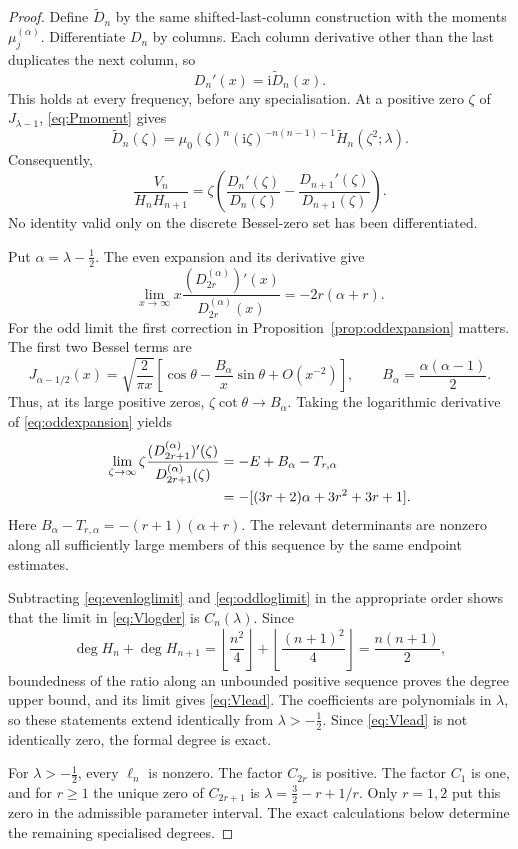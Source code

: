 \documentclass[11pt]{article}
\numberwithin{equation}{section}
\theoremstyle{remark}
\newcommand{\ii}{\mathrm{i}}
\newcommand{\wt}{\widetilde}
\begin{document}
\begin{proof}
Define $\wt D_n$ by the same shifted-last-column construction with the
moments $\mu_j^{(\alpha)}$. Differentiate $D_n$ by columns. Each
column derivative other than the last duplicates the next column, so
\begin{equation}\label{eq:shiftderivative}
                              D_n'(x)=\ii\wt D_n(x).
\end{equation}
This holds at every frequency, before any specialisation. At a positive
zero $\zeta$ of $J_{\lambda-1}$, \eqref{eq:Pmoment} gives
\[
 \wt D_n(\zeta)=\mu_0(\zeta)^n
          (\ii\zeta)^{-n(n-1)-1}\wt H_n(\zeta^2;\lambda).
\]
Consequently,
\begin{equation}\label{eq:Vlogder}
 \frac{V_n}{H_nH_{n+1}}
 =\zeta\left(\frac{D_n'(\zeta)}{D_n(\zeta)}
             -\frac{D_{n+1}'(\zeta)}{D_{n+1}(\zeta)}\right).
\end{equation}
No identity valid only on the discrete Bessel-zero set has been
differentiated.

Put $\alpha=\lambda-\tfrac12$. The even expansion and its derivative
give
\begin{equation}\label{eq:evenloglimit}
 \lim_{x\to\infty}x\frac{(D_{2r}^{(\alpha)})'(x)}{D_{2r}^{(\alpha)}(x)}
                        =-2r(\alpha+r).
\end{equation}
For the odd limit the first correction in
Proposition~\ref{prop:oddexpansion} matters. The first two Bessel terms
are
\[
 J_{\alpha-1/2}(x)=\sqrt{\frac2{\pi x}}
 \left[\cos\theta-\frac{B_\alpha}{x}\sin\theta+O(x^{-2})\right],
 \qquad B_\alpha=\frac{\alpha(\alpha-1)}2.
\]
Thus, at its large positive zeros, $\zeta\cot\theta\to B_\alpha$.
Taking the logarithmic derivative of \eqref{eq:oddexpansion} yields
\begin{align}
 \lim_{\zeta\to\infty}\zeta
 \frac{(D_{2r+1}^{(\alpha)})'(\zeta)}{D_{2r+1}^{(\alpha)}(\zeta)}
 &=-E+B_\alpha-T_{r,\alpha}\notag\\
 &=-[(3r+2)\alpha+3r^2+3r+1].\label{eq:oddloglimit}
\end{align}
Here $B_\alpha-T_{r,\alpha}=-(r+1)(\alpha+r)$. The relevant
determinants are nonzero along all sufficiently large members of this
sequence by the same endpoint estimates.

Subtracting \eqref{eq:evenloglimit} and \eqref{eq:oddloglimit} in
the appropriate order shows that the limit in \eqref{eq:Vlogder} is
$C_n(\lambda)$. Since
\[
 \deg H_n+\deg H_{n+1}
 =\left\lfloor\frac{n^2}4\right\rfloor
  +\left\lfloor\frac{(n+1)^2}4\right\rfloor=\frac{n(n+1)}2,
\]
boundedness of the ratio along an unbounded positive sequence proves
the degree upper bound, and its limit gives \eqref{eq:Vlead}.
The coefficients are polynomials in $\lambda$, so these statements
extend identically from $\lambda>-\tfrac12$. Since \eqref{eq:Vlead}
is not identically zero, the formal degree is exact.

For $\lambda>-\tfrac12$, every $\ell_n$ is nonzero.
The factor $C_{2r}$ is positive. The factor $C_1$ is one, and for
$r\ge1$ the unique zero of $C_{2r+1}$ is
$\lambda=\tfrac32-r+1/r$. Only $r=1,2$ put this zero in the
admissible parameter interval. The exact calculations below determine
the remaining specialised degrees.
\end{proof}
\end{document}
